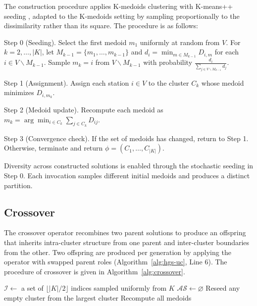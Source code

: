 The construction procedure applies K-medoids clustering with K-means++ seeding \citep{arthurKmeansAdvantagesCareful2007}, adapted to the K-medoids setting by sampling proportionally to the dissimilarity rather than its square. The procedure is as follows:

Step 0 (Seeding). Select the first medoid ${{m}_{1}}$ uniformly at random from $V$. For $k=2,\ldots ,\left| K \right|$, let ${{M}_{k-1}}=\{{{m}_{1}},\ldots ,{{m}_{k-1}}\}$ and ${{d}_{i}}={{\min }_{m\in {{M}_{k-1}}}}{{D}_{i,m}}$ for each $i\in V\backslash {{M}_{k-1}}$. Sample ${{m}_{k}}=i$ from $V\backslash {{M}_{k-1}}$ with probability $\frac{{{d}_{i}}}{\sum\limits_{j\in V\backslash {{M}_{k-1}}}{{{d}_{j}}}}.$

Step 1 (Assignment). Assign each station $i\in V$ to the cluster ${{C}_{k}}$ whose medoid minimizes ${{D}_{i,{{m}_{k}}}}$.

Step 2 (Medoid update). Recompute each medoid as ${{m}_{k}}=\arg {{\min }_{i\in {{C}_{k}}}}\sum\limits_{j\in {{C}_{k}}}{{{D}_{ij}}}$.

Step 3 (Convergence check). If the set of medoids has changed, return to Step 1. Otherwise, terminate and return $\phi =({{C}_{1}},\ldots ,{{C}_{\left| K \right|}})$.

Diversity across constructed solutions is enabled through the stochastic seeding in Step 0. Each invocation samples different initial medoids and produces a distinct partition.

\subsection{Crossover}\label{ch3:subsec:crossover}

The crossover operator recombines two parent solutions to produce an offspring that inherits intra-cluster structure from one parent and inter-cluster boundaries from the other. Two offspring are produced per generation by applying the operator with swapped parent roles (Algorithm~\ref{alg:hgs-uc}, Line 6). The procedure of crossover is given in Algorithm~\ref{alg:crossover}.

\begin{algorithm}[htbp]
\caption{Crossover$(\phi_A,\phi_B)$}
\label{alg:crossover}
$\mathcal{I}\leftarrow$ a set of $\lfloor |K|/2\rfloor$ indices sampled uniformly from $K$\;
$\mathcal{AS}\leftarrow\varnothing$
Reseed any empty cluster from the largest cluster\;
Recompute all medoids\;
\end{algorithm}

